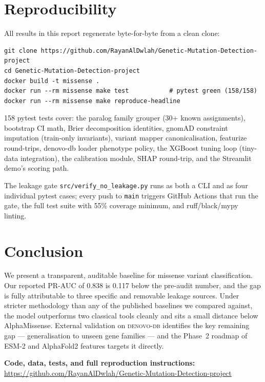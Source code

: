 \documentclass[11pt,a4paper]{article}
\begin{document}
\section{Reproducibility}

All results in this report regenerate byte-for-byte from a clean
clone:

\begin{verbatim}
git clone https://github.com/RayanAlDwlah/Genetic-Mutation-Detection-project
cd Genetic-Mutation-Detection-project
docker build -t missense .
docker run --rm missense make test           # pytest green (158/158)
docker run --rm missense make reproduce-headline
\end{verbatim}

158 pytest tests cover: the paralog family grouper (30+ known
assignments), bootstrap CI math, Brier decomposition identities,
gnomAD constraint imputation (train-only invariants), variant
mapper canonicalisation, featurize round-trips, denovo-db loader
phenotype policy, the XGBoost tuning loop (tiny-data integration),
the calibration module, SHAP round-trip, and the Streamlit demo's
scoring path.

The leakage gate \texttt{src/verify\_no\_leakage.py} runs as both
a CLI and as four individual pytest cases; every push to
\texttt{main} triggers GitHub Actions that run the gate, the full
test suite with 55\% coverage minimum, and ruff/black/mypy
linting.

\section{Conclusion}

We present a transparent, auditable baseline for missense variant
classification. Our reported PR-AUC of 0.838 is 0.117 below the
pre-audit number, and the gap is fully attributable to three
specific and removable leakage sources. Under stricter methodology
than any of the published baselines we compared against, the model
outperforms two classical tools cleanly and sits a small distance
below AlphaMissense. External validation on \textsc{denovo-db}
identifies the key remaining gap --- generalisation to unseen
gene families --- and the Phase~2 roadmap of ESM-2 and
AlphaFold2 features targets it directly.

\vspace{1em}
\noindent\textbf{Code, data, tests, and full reproduction
instructions:}
\url{https://github.com/RayanAlDwlah/Genetic-Mutation-Detection-project}



\end{document}
